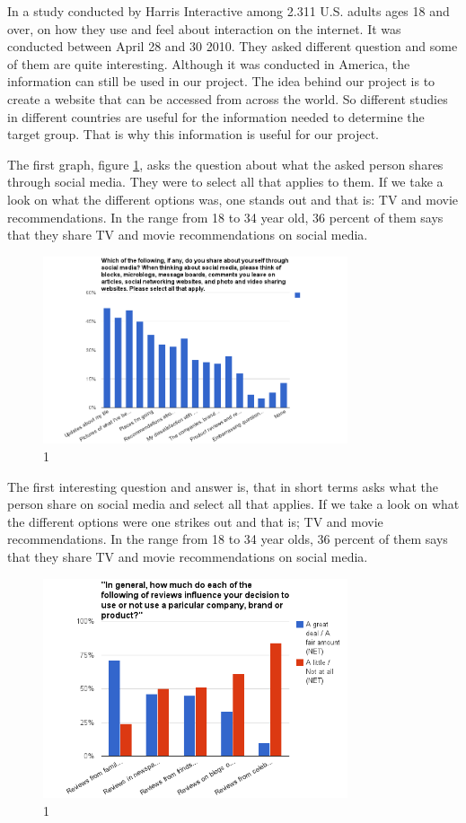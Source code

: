 In a study conducted by Harris Interactive \cite{Harris} among 2.311 U.S. adults ages 18 and over, on how they use and feel about interaction on the internet. It was conducted between April 28 and 30 2010. They asked different question and some of them are quite interesting.
Although it was conducted in America, the information can still be used in our project. The idea behind our project is to create a website that can be accessed from across the world. So different studies in different countries are useful for the information needed to determine the target group. That is why this information is useful for our project.

The first graph, figure \ref{Teori1}, asks the question about what the asked person shares through social media. They were to select all that applies to them. If we take a look on what the different options was, one stands out and that is: TV and movie recommendations. In the range from 18 to 34 year old, 36 percent of them says that they share TV and movie recommendations on social media.

\begin{figure}[H]
\centering
\includegraphics[width=0.8\textwidth]{Images/teori1.png}
\caption{1}
\label{Teori1}
\end{figure}

The first interesting question and answer is, that in short terms asks what the person share on social media and select all that applies. If we take a look on what the different options were one strikes out and that is; TV and movie recommendations. In the range from 18 to 34 year olds, 36 percent of them says that they share TV and movie recommendations on social media.

\begin{figure}[H]
\centering
\includegraphics[width=0.8\textwidth]{Images/teori2.png}
\caption{1}
\label{Teori2}
\end{figure}

